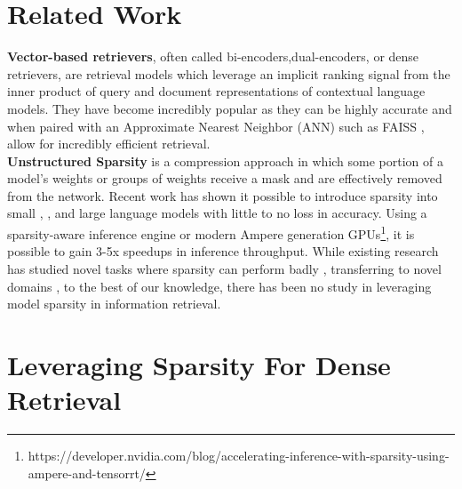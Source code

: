 \documentclass[11pt]{article}
\begin{document}
\section{Related Work}
\textbf{Vector-based retrievers}, often called bi-encoders,dual-encoders, or dense retrievers, are retrieval models which leverage an implicit ranking signal from the inner product of query and document representations of contextual language models. They have become incredibly popular as they can be highly accurate \cite{pouran-ben-veyseh-etal-2021-dpr} \cite{Karpukhin2020DensePR} and when paired with an Approximate Nearest Neighbor (ANN) such as FAISS \cite{johnson2019billion}, allow for incredibly efficient retrieval. \\
\textbf{Unstructured Sparsity} is a compression approach in which some portion of a model's weights or groups of weights receive a mask and are effectively removed from the network. Recent work has shown it possible to introduce sparsity into small \cite{Kurti2022TheOB}, \cite{Sanh2020MovementPA}, \cite{Zafrir2021PruneOF} and large language models \cite{Frantar2023SparseGPTML} with little to no loss in accuracy. Using a sparsity-aware inference engine or modern Ampere generation GPUs\footnote{https://developer.nvidia.com/blog/accelerating-inference-with-sparsity-using-ampere-and-tensorrt/}, it is possible to gain 3-5x speedups in inference throughput. While existing research has studied novel tasks where sparsity can perform badly \cite{Liu2023SparsityMC}, transferring to novel domains \cite{Campos2022SparseBERTSM}, to the best of our knowledge, there has been no study in leveraging model sparsity in information retrieval.\\
\section{Leveraging Sparsity For Dense Retrieval}
\end{document}
